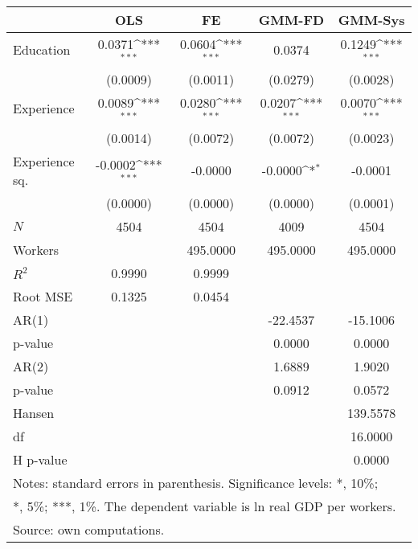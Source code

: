 {
\def\sym#1{\ifmmode^{#1}\else\(^{#1}\)\fi}
\begin{tabular}{l*{4}{c}}
\hline\hline
            &\multicolumn{1}{c}{OLS}&\multicolumn{1}{c}{FE}&\multicolumn{1}{c}{GMM-FD}&\multicolumn{1}{c}{GMM-Sys}\\
\hline
Education   &      0.0371\sym{***}&      0.0604\sym{***}&      0.0374         &      0.1249\sym{***}\\
            &    (0.0009)         &    (0.0011)         &    (0.0279)         &    (0.0028)         \\
[1em]
Experience  &      0.0089\sym{***}&      0.0280\sym{***}&      0.0207\sym{***}&      0.0070\sym{***}\\
            &    (0.0014)         &    (0.0072)         &    (0.0072)         &    (0.0023)         \\
[1em]
Experience sq.&     -0.0002\sym{***}&     -0.0000         &     -0.0000\sym{*}  &     -0.0001         \\
            &    (0.0000)         &    (0.0000)         &    (0.0000)         &    (0.0001)         \\
\hline
\(N\)       &        4504         &        4504         &        4009         &        4504         \\
Workers     &                     &    495.0000         &    495.0000         &    495.0000         \\
$R^{2}$     &      0.9990         &      0.9999         &                     &                     \\
Root MSE    &      0.1325         &      0.0454         &                     &                     \\
AR(1)       &                     &                     &    -22.4537         &    -15.1006         \\
p-value     &                     &                     &      0.0000         &      0.0000         \\
AR(2)       &                     &                     &      1.6889         &      1.9020         \\
p-value     &                     &                     &      0.0912         &      0.0572         \\
Hansen      &                     &                     &                     &    139.5578         \\
df          &                     &                     &                     &     16.0000         \\
H p-value   &                     &                     &                     &      0.0000         \\
\hline\hline
\multicolumn{5}{l}{\footnotesize Notes: standard errors in parenthesis. Significance levels: *, 10\%;}\\
\multicolumn{5}{l}{\footnotesize **, 5\%; ***, 1\%. The dependent variable is ln real GDP per workers.}\\
\multicolumn{5}{l}{\footnotesize Source: own computations.}\\
\end{tabular}
}
